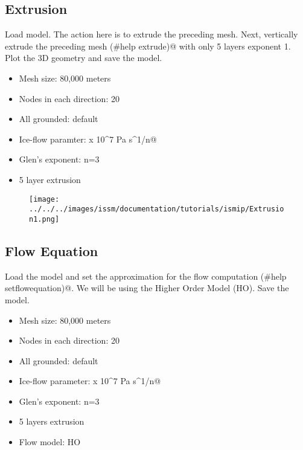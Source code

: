 \subsection{Extrusion} %
Load \verb@Parameterization@ model. The action here is to extrude the preceding mesh. Next, vertically
extrude the preceding mesh \verb@(#help extrude)@ with only 5 layers exponent 1. Plot the 3D
geometry and save the model.
\begin{itemize}
	\item Mesh size: 80,000 meters
	\item Nodes in each direction: 20
	\item All grounded: default
	\item Ice-flow paramter:  x 10^7 Pa s^1/n@
	\item Glen's exponent: n=3
	\item 5 layer extrusion
\end{itemize}
\begin{figure}[H]
	\begin{center}
		\texttt{[image: ../../../images/issm/documentation/tutorials/ismip/Extrusion1.png]}
	\end{center}
\end{figure}
\subsection{Flow Equation} %
Load the \verb@Extrusion@ model and set the approximation for the flow computation \verb@(#help setflowequation)@. We will be using the Higher Order Model (HO). Save the model.
\begin{itemize}
	\item Mesh size: 80,000 meters
	\item Nodes in each direction: 20
	\item All grounded: default
	\item Ice-flow parameter:  x 10^7 Pa s^1/n@
	\item Glen's exponent: n=3
	\item 5 layers extrusion
	\item Flow model: HO
\end{itemize}
